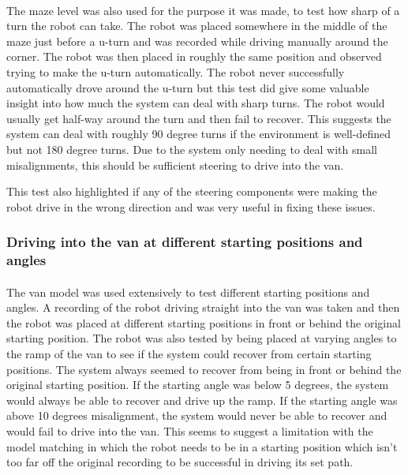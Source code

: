 \paragraph{}
The maze level was also used for the purpose it was made, to test how sharp of a turn the robot can take. The robot was placed somewhere in the middle of the maze just before a u-turn and was recorded while driving manually around the corner. The robot was then placed in roughly the same position and observed trying to make the u-turn automatically. The robot never successfully automatically drove around the u-turn but this test did give some valuable insight into how much the system can deal with sharp turns. The robot would usually get half-way around the turn and then fail to recover. This suggests the system can deal with roughly 90 degree turns if the environment is well-defined but not 180 degree turns. Due to the system only needing to deal with small misalignments, this should be sufficient steering to drive into the van.

This test also highlighted if any of the steering components were making the robot drive in the wrong direction and was very useful in fixing these issues.

\subsubsection{Driving into the van at different starting positions and angles}
\paragraph{}
The van model was used extensively to test different starting positions and angles. A recording of the robot driving straight into the van was taken and then the robot was placed at different starting positions in front or behind the original starting position. The robot was also tested by being placed at varying angles to the ramp of the van to see if the system could recover from certain starting positions. The system always seemed to recover from being in front or behind the original starting position. If the starting angle was below 5 degrees, the system would always be able to recover and drive up the ramp. If the starting angle was above 10 degrees misalignment, the system would never be able to recover and would fail to drive into the van. This seems to suggest a limitation with the model matching in which the robot needs to be in a starting position which isn't too far off the original recording to be successful in driving its set path.

